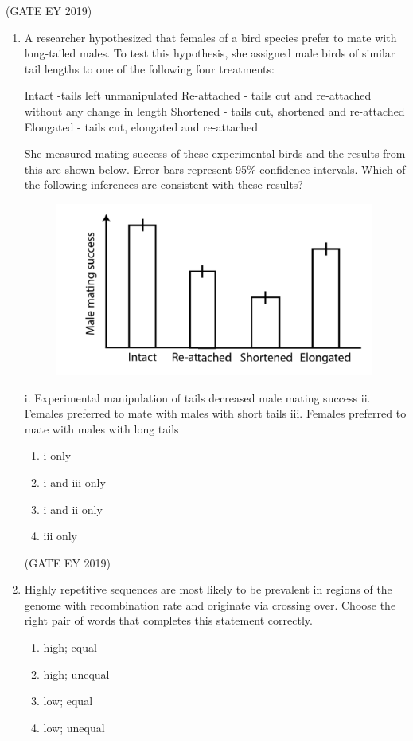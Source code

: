 \documentclass[journal,12pt,onecolumn]{IEEEtran}
\theoremstyle{remark}
\begin{document}
\hfill{(GATE EY 2019)}
\begin{enumerate}[resume]

\item A researcher hypothesized that females of a bird species prefer to mate with long-tailed males. To test this hypothesis, she assigned male birds of similar tail lengths to one of the following four treatments:  

 Intact -tails left unmanipulated  
 Re-attached - tails cut and re-attached without any change in length  
 Shortened - tails cut, shortened and re-attached  
 Elongated - tails cut, elongated and re-attached  

She measured mating success of these experimental birds and the results from this are shown below. Error bars represent 95\% confidence intervals. Which of the following inferences are consistent with these results?  


\begin{figure}[h]
    \centering
    \includegraphics[]{figs/28.png}
    \caption{}
    \label{fig:4}
\end{figure}

i. Experimental manipulation of tails decreased male mating success  
ii. Females preferred to mate with males with short tails  
iii. Females preferred to mate with males with long tails  
\begin{multicols}{2}
\begin{enumerate}
\item   i only
\item   i and iii only
\item   i and ii only
\item   iii only
\end{enumerate}
\end{multicols}


\hfill{(GATE EY 2019)}
\item Highly repetitive sequences are most likely to be prevalent in regions of the genome with  \underline{\hspace{1.5cm}}recombination rate and originate via  \underline{\hspace{1.5cm}}crossing over. Choose the right pair of words that completes this statement correctly.  
\begin{multicols}{2}
\begin{enumerate}
\item high; equal
\item high; unequal
\item low; equal 
\item low; unequal
\end{enumerate}
\end{multicols}


\end{enumerate}
\end{document}
